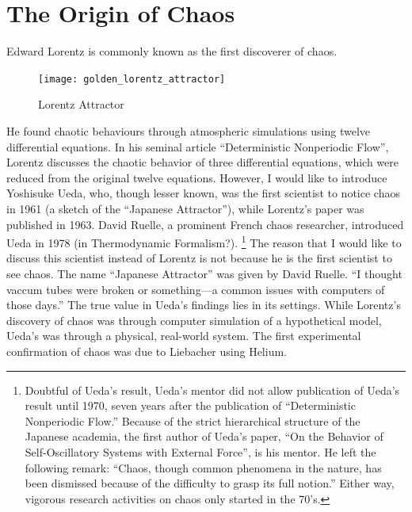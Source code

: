\documentclass[12pt,twoside]{book}
\begin{document}
\section{The Origin of Chaos}
Edward Lorentz is commonly known as the first discoverer of chaos.
\begin{figure}[t]
  \begin{center}
    \texttt{[image: golden\_lorentz\_attractor]}
  \end{center}
  \caption{Lorentz Attractor}
  \label{fig:lorentz}
\end{figure}
He found chaotic behaviours through atmospheric simulations using twelve differential equations.
In his seminal article ``Deterministic Nonperiodic Flow'', Lorentz discusses the chaotic behavior of three differential equations, which were reduced from the original twelve equations.
However, I would like to introduce Yoshisuke Ueda, who, though lesser known, was the first scientist to notice chaos in 1961 (a sketch of the ``Japanese Attractor''), while Lorentz's paper was published in 1963.
David Ruelle, a prominent French chaos researcher, introduced Ueda in 1978 (in Thermodynamic Formalism?).
\footnote{Doubtful of Ueda's result, Ueda's mentor did not allow publication of Ueda's result until 1970, seven years after the publication of ``Deterministic Nonperiodic Flow.''
Because of the strict hierarchical structure of the Japanese academia, the first author of Ueda's paper, ``On the Behavior of Self-Oscillatory Systems with External Force'', is his mentor.%
He left the following remark: ``Chaos, though common phenomena in the nature, has been dismissed because of the difficulty to grasp its full notion.''\citep[p533]{gleick}
Either way, vigorous research activities on chaos only started in the 70's.}
The reason that I would like to discuss this scientist instead of Lorentz is not because he is the first scientist to see chaos.
The name ``Japanese Attractor'' was given by David Ruelle.
``I thought vaccum tubes were broken or something---a common issues with computers of those days.'' \citep{lorentzbook} %
The true value in Ueda's findings lies in its settings.
While Lorentz's discovery of chaos was through computer simulation of a hypothetical model, Ueda's was through a physical, real-world system.
The first experimental confirmation of chaos was due to Liebacher using Helium.
\end{document}
